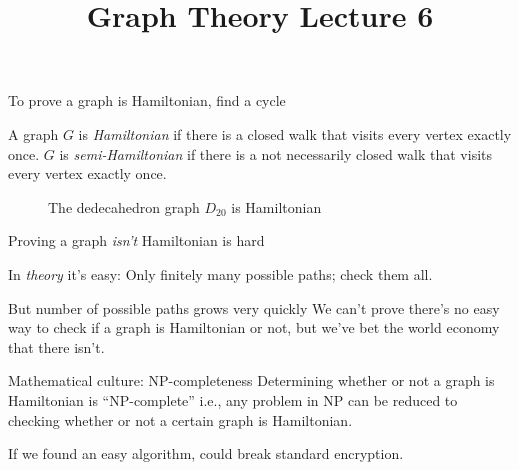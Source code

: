 \documentclass{beamer}
\title{Graph Theory Lecture 6}
\begin{document}
\begin{frame}{To prove a graph is Hamiltonian, find a cycle}
   \begin{definition}A graph $G$ is \emph{Hamiltonian} if there is a closed walk that visits every vertex exactly once. $G$ is \emph{semi-Hamiltonian} if there is a not necessarily closed walk that visits every vertex exactly once.
  \end{definition}
  \begin{figure}
      \caption{The dedecahedron graph $D_{20}$ is Hamiltonian}
    \end{figure}

\end{frame}   

\begin{frame}{Proving a graph \emph{isn't} Hamiltonian is hard}
  \begin{block}{In \emph{theory} it's easy:}
    Only finitely many possible paths; check them all.
  \end{block}
  \begin{block}{But number of possible paths grows very quickly}
We can't prove there's no easy way to check if a graph is Hamiltonian or not, but we've bet the world economy that there isn't.
  \end{block}
  
\begin{block}{Mathematical culture: NP-completeness}
  Determining whether or not a graph is Hamiltonian is ``NP-complete'' i.e., any problem in NP can be reduced to checking whether or not a certain graph is Hamiltonian. 
\end{block}
If we found an easy algorithm, could break standard encryption.
  \end{frame}
\end{document}
